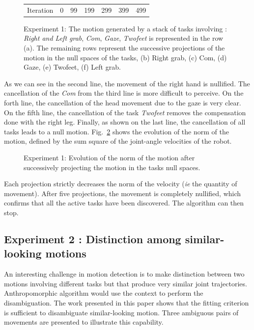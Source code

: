 \documentclass[journal]{IEEEtran}
\begin{document}
\begin{figure}[t]
\begin{tabular}{c@{}c@{}c@{}c@{}c@{}c@{}c}
\\
Iteration & 0 & 99 & 199 & 299 & 399 & 499\\
\end{tabular}
\caption{Experiment 1: The motion generated by a stack of tasks involving :
\emph{Right and Left grab}, \emph{Com}, \emph{Gaze}, \emph{Twofeet} is represented in the row (a).
The remaining rows represent the successive projections of the motion in the null spaces of the tasks,
(b) Right grab, (c) Com, (d) Gaze, (e) Twofeet, (f) Left grab.}
\label{fig:snapshotXpqdot}
\end{figure}
As we can see in the second line, the movement of the right hand is nullified. The cancellation of
the \emph{Com} from the third line is more difficult to perceive. On the forth line, the cancellation
of the head movement due to the gaze is very clear. On the fifth line, the cancellation of the task \emph{Twofeet}
removes the compensation done with the right leg. Finally, as shown on the last line,
the cancellation of all tasks leads to a null motion.
Fig.~\ref{fig:xp3Pqdot} shows the evolution of the norm of the motion,
defined by the sum square of the joint-angle velocities of the robot.
\begin{figure}[t]
\begin{center}
\resizebox{.4\textwidth}{!} {
      
    }
\end{center}
\caption{Experiment 1: Evolution of the norm of the motion after successively projecting the motion in the
	tasks null spaces.}
\label{fig:xp3Pqdot}
\end{figure}
Each projection strictly decreases the norm of the velocity (\emph{ie} the quantity of  movement). After
five projections, the movement is completely nullified, which confirms that all the active tasks have been
discovered. The algorithm can then stop.

\subsection{Experiment 2 : Distinction among similar-looking motions}
\label{sec:distinc}
An interesting challenge in motion detection
is to make distinction between two motions
involving different tasks but that produce very similar joint trajectories.
Anthropomorphic algorithm would use the context to perform the disambiguation.
The work presented in this paper shows that the fitting criterion
is sufficient to disambiguate similar-looking motion. Three ambiguous pairs of movements
are presented to illustrate this capability.
\end{document}
